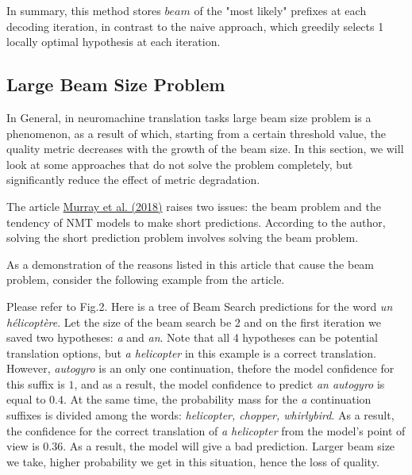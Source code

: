 \documentclass[a4paper,14pt]{extarticle}
\newcommand{\bibref}[3]{\hyperlink{#1}{#2 (#3)}}
\begin{document}
	In summary, this method stores $beam$ of the "most likely" prefixes at each decoding iteration, in contrast to the naive approach, which greedily selects 1 locally optimal hypothesis at each iteration.
	
	\subsection{Large Beam Size Problem}
	In General, in neuromachine translation tasks large beam size problem is a phenomenon, as a result of which, starting from a certain threshold value, the quality metric decreases with the growth of the beam size. In this section, we will look at some approaches that do not solve the problem completely, but significantly reduce the effect of metric degradation.
	
	The article \bibref{corr_len_bias}{Murray et al.}{2018} raises two issues: the beam problem and the tendency of NMT models to make short predictions. According to the author, solving the short prediction problem involves solving the beam problem.
	
	As a demonstration of the reasons listed in this article that cause the beam problem, consider the following example from the article.
	
	Please refer to Fig.2. Here is a tree of Beam Search predictions for the word \textit{un hélicoptère}. Let the size of the beam search be 2 and on the first iteration we saved two hypotheses: \textit{a} and \textit{an}. Note that all 4 hypotheses can be potential translation options, but \textit{a helicopter} in this example is a correct translation. However, \textit{autogyro} is an only one continuation, thefore the model confidence for this suffix is $1$, and as a result, the model confidence to predict \textit{an autogyro} is equal to $0.4$. At the same time, the probability mass for the \textit{a} continuation suffixes is divided among the words: \textit{helicopter, chopper, whirlybird}. As a result, the confidence for the correct translation of \textit{a helicopter} from the model's point of view is $0.36$. As a result, the model will give a bad prediction. Larger beam size we take, higher probability we get in this situation, hence the loss of quality.
	
	\begin{figure}[t]
	\end{figure}
	
\end{document}
